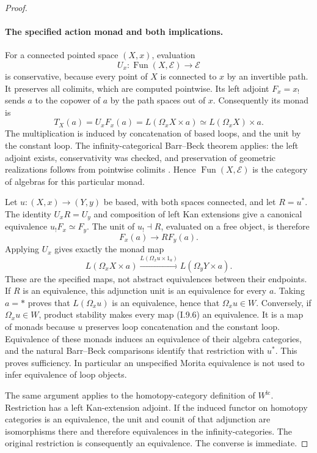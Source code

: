 \begin{proof}
\paragraph{The specified action monad and both implications.}
For a connected pointed space $(X,x)$, evaluation
\[
 U_x:\operatorname{Fun}(X,\mathcal E)\longrightarrow\mathcal E
\]
is conservative, because every point of $X$ is connected to $x$ by an invertible path. It preserves all colimits, which are computed pointwise. Its left adjoint $F_x=x_!$ sends $a$ to the copower of $a$ by the path spaces out of $x$. Consequently its monad is
\[
 T_X(a)=U_xF_x(a)
       =L(\Omega_xX\times a)
       \simeq L(\Omega_xX)\times a.
 \tag{I.9.5}
\]
The multiplication is induced by concatenation of based loops, and the unit by the constant loop. The infinity-categorical Barr--Beck theorem applies: the left adjoint exists, conservativity was checked, and preservation of geometric realizations follows from pointwise colimits \citep[Theorem~4.7.3.5]{GHIJLurie2017}. Hence $\operatorname{Fun}(X,\mathcal E)$ is the category of algebras for this particular monad.

Let $u:(X,x)\to(Y,y)$ be based, with both spaces connected, and let $R=u^*$. The identity $U_xR=U_y$ and composition of left Kan extensions give a canonical equivalence $u_!F_x\simeq F_y$. The unit of $u_!\dashv R$, evaluated on a free object, is therefore
\[
 F_x(a)\longrightarrow R F_y(a).
\]
Applying $U_x$ gives exactly the monad map
\[
 L(\Omega_xX\times a)\xrightarrow{L(\Omega_xu\times1_a)}
 L(\Omega_yY\times a).
 \tag{I.9.6}
\]
These are the specified maps, not abstract equivalences between their endpoints. If $R$ is an equivalence, this adjunction unit is an equivalence for every $a$. Taking $a=*$ proves that $L(\Omega_xu)$ is an equivalence, hence that $\Omega_xu\in W$. Conversely, if $\Omega_xu\in W$, product stability makes every map (I.9.6) an equivalence. It is a map of monads because $u$ preserves loop concatenation and the constant loop. Equivalence of these monads induces an equivalence of their algebra categories, and the natural Barr--Beck comparisons identify that restriction with $u^*$. This proves sufficiency. In particular an unspecified Morita equivalence is not used to infer equivalence of loop objects.

The same argument applies to the homotopy-category definition of $W^{\mathrm{lc}}$. Restriction has a left Kan-extension adjoint. If the induced functor on homotopy categories is an equivalence, the unit and counit of that adjunction are isomorphisms there and therefore equivalences in the infinity-categories. The original restriction is consequently an equivalence. The converse is immediate.


\end{proof}
